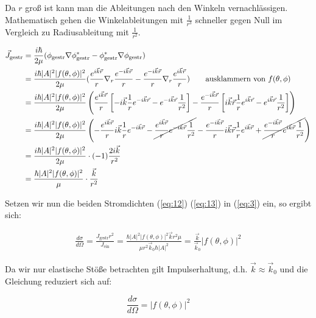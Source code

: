 Da \(r\) groß ist kann man die Ableitungen nach den Winkeln vernachlässigen. Mathematisch gehen die Winkelableitungen mit \(\frac{1}{r^3}\) schneller gegen Null im Vergleich zu Radiusableitung mit \(\frac{1}{r^2}\).

\begin{align}
  \label{eq:13}
 \vec J_{\text{gestr}} &= \frac{i\hbar}{2\mu} (\phi_{\text{gestr}} \nabla \phi^*_{\text{gestr}} - \phi^*_{\text{gestr}}\nabla\phi_{\text{gestr}})\\
&= \frac{i\hbar |A|^2 |f(\theta,\phi)|^2 }{2\mu} ( \frac{e^{i\vec k\vec r}}{r}  \nabla_r \frac{e^{-i\vec k\vec r}}{r}  - \frac{e^{-i\vec k\vec r}}{r} \nabla_r \frac{e^{i\vec k\vec r}}{r}  ) \qquad \text{ausklammern von }f(\theta,\phi)\text{ }  \\
&= \frac{i\hbar |A|^2 |f(\theta,\phi)|^2 }{2\mu} \left( \frac{e^{i\vec k\vec r}}{r} \left[-i\vec k \frac{1}{r}  e^{-i\vec k\vec r}- e^{-i\vec k\vec r}\frac{1}{r^2}\right]  - \frac{e^{-i\vec k\vec r}}{r} \left[ i\vec k\vec r \frac{1}{r} e^{i\vec k\vec r} -  e^{i\vec k\vec r}\frac{1}{r^2}\right]  \right)\\
&= \frac{i\hbar |A|^2 |f(\theta,\phi)|^2 }{2\mu} \left(- \frac{e^{i\vec k\vec r}}{r} i\vec k \frac{1}{r}  e^{-i\vec k\vec r}-\cancel{ \frac{e^{i\vec k\vec r}}{r} e^{-i\vec k\vec r}\frac{1}{r^2}}  - \frac{e^{-i\vec k\vec r}}{r} i\vec k\vec r \frac{1}{r} e^{i\vec k\vec r} + \cancel{\frac{e^{-i\vec k\vec r}}{r} e^{i\vec k\vec r}\frac{1}{r^2}}  \right)\\
&= \frac{i\hbar |A|^2 |f(\theta,\phi)|^2 }{2\mu} \cdot (-1)\frac{ 2i\vec k }{r^2} \\
&= \frac{\hbar |A|^2 |f(\theta,\phi)|^2 }{\mu} \cdot\frac{\vec k }{r^2}
\end{align}



Setzen wir nun die beiden Stromdichten (\ref{eq:12}) (\ref{eq:13}) in  (\ref{eq:3}) ein, so ergibt sich:

\begin{align}
  \label{eq:14}
   \frac{d\sigma}{d\Omega} = \frac{ J_{\text{gestr}}r^2 }{J_{\text{ein}}} = \frac{\hbar |A|^2 |f(\theta,\phi)|^2 \vec k r^2\mu }{\mu r^2 \vec k_{0}\hbar|A|^2 } = \frac{  \vec k }{ \vec k_{0} }|f(\theta,\phi)|^2 
\end{align}

Da wir nur elastische Stöße betrachten gilt Impulserhaltung, d.h. \(\vec k\approx\vec k_0\) und die Gleichung reduziert sich auf:

\begin{equation}
  \label{eq:15}
\boxed{  \frac{d\sigma}{d\Omega}= |f(\theta,\phi)|^2 }
\end{equation}


